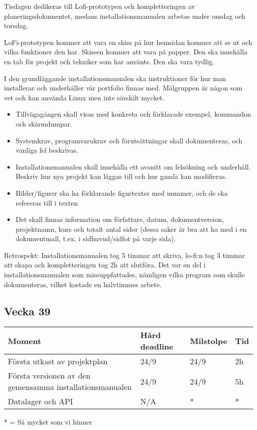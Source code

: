\documentclass{TDP003mall}
\begin{document}
Tisdagen dedikeras till Lofi-prototypen och kompletteringen av planeringsdokumentet, medans installationsmanualen arbetas under onsdag och torsdag.

LoFi-prototypen kommer att vara en skiss på hur hemsidan kommer att se ut och vilka funktioner den har. Skissen kommer att vara på papper. Den ska innehålla en tab för projekt och tekniker som har använts. Den ska vara tydlig.

I den grundläggande installationsmanualen ska instruktioner för hur man installerar och underhåller vår portfolio finnas med. Målgruppen är någon som vet och kan använda Linux men inte särskilt mycket.

\begin{itemize}
\item
  Tillvägagången skall visas med konkreta och förklarade exempel, kommandon och skärmdumpar.
\item	
  Systemkrav, programvarukrav och förutsättningar skall dokumenteras, och vanliga fel beskrivas.
\item	
  Installationsmanualen skall innehålla ett avsnitt om felsökning och underhåll. Beskriv hur nya projekt kan läggas till och hur gamla kan modifieras.
\item	
  Bilder/figurer ska ha förklarande figurtexter med nummer, och de ska refereras till i texten
\item	
  Det skall finnas information om författare, datum, dokumentversion, projektnamn, kurs och totalt antal sidor (dessa saker är bra att ha med i en dokumentmall, t.ex. i sidhuvud/sidfot på varje sida). 
\end{itemize}

Retrospekt: Installationsmanualen tog 5 timmar att skriva, lo-fi:n tog 3 timmar  att skapa och kompletteringen tog 2h att slutföra. Det var en del i installationsmanualen som missuppfattades, nämligen vilka program som skulle dokumenteras, vilket kostade en halvtimmes arbete.

\subsection*{Vecka 39}
\begin{table}[!h]
\begin{tabularx}{\linewidth}{|X|l|l|l|}
\hline
Moment & Hård deadline & Milstolpe & Tid \\\hline
Första utkast av projektplan & 24/9 & 24/9 & 2h \\\hline
Första versionen av den gemensamma installationsmanualen & 24/9 & 24/9 & 5h \\\hline
Datalager och API & N/A & * & *\\\hline
\end{tabularx}
\end{table}
* = Så mycket som vi hinner
\end{document}
